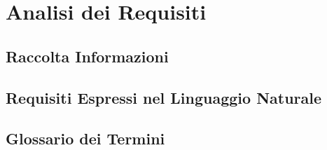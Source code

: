 \documentclass[12pt]{article} %
\begin{document}








\tableofcontents

\newpage


	\section{Analisi dei Requisiti}

	



		\subsection{Raccolta Informazioni} %

		
		\subsection{Requisiti Espressi nel Linguaggio Naturale}

		

		\subsection{Glossario dei Termini}

		
		\newpage
\end{document}
